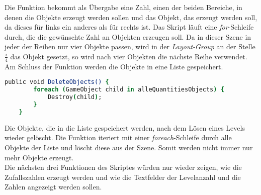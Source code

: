 Die Funktion bekommt als Übergabe eine Zahl, einen der beiden Bereiche, in denen die Objekte erzeugt werden sollen und das Objekt, das erzeugt werden soll, da dieses für links ein anderes als für rechts ist. Das Skript läuft eine \textit{for}-Schleife durch, die die gewünschte Zahl an Objekten erzeugen soll. Da in dieser Szene in jeder der Reihen nur vier Objekte passen, wird in der \textit{Layout-Group} an der Stelle $\frac{i}{4}$ das Objekt gesetzt, so wird nach vier Objekten die nächste Reihe verwendet. Am Schluss der Funktion werden die Objekte in eine Liste gespeichert.\\
\begin{lstlisting}[language=csh, caption={GameQuantities.cs Delete-Funktion}]
	public void DeleteObjects() {
		foreach (GameObject child in alleQuantitiesObjects) {
			Destroy(child);
		}
	}
\end{lstlisting}
Die Objekte, die in die Liste gespeichert werden, nach dem Lösen eines Levels wieder gelöscht. Die Funktion iteriert mit einer \textit{foreach}-Schleife durch alle Objekte der Liste und löscht diese aus der Szene. Somit werden nicht immer nur mehr Objekte erzeugt.\\

Die nächsten drei Funktionen des Skriptes würden nur wieder zeigen, wie die Zufallszahlen erzeugt werden und wie die Textfelder der Levelanzahl und die Zahlen angezeigt werden sollen.\\

